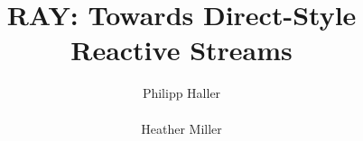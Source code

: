 \documentclass{acm_proc_article-sp}
\begin{document}
\title{RAY: Towards Direct-Style Reactive Streams}
%
%
%
%
%

%
\author{
%
%
\alignauthor
Philipp Haller\\
       \\
\alignauthor
Heather Miller\\
       \\
}
\end{document}
